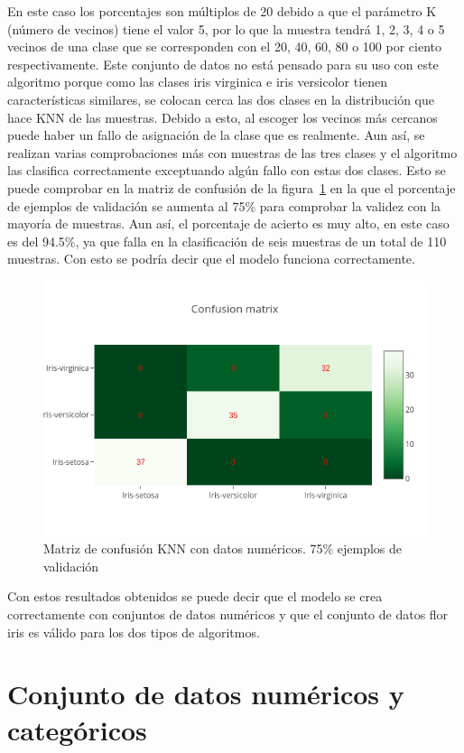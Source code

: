 \documentclass[a4paper, 12pt]{book}
\begin{document}
En este caso los porcentajes son múltiplos de 20 debido a que el parámetro K (número de vecinos) tiene el valor 5, por lo que la muestra tendrá 1, 2, 3, 4 o 5 vecinos de una clase que se corresponden con el 20, 40, 60, 80 o 100 por ciento respectivamente. 
Este conjunto de datos no está pensado para su uso con este algoritmo porque como las clases iris virginica e iris versicolor tienen características similares, se colocan cerca las dos clases en la distribución que hace KNN de las muestras. Debido a esto, al escoger los vecinos más cercanos puede haber un fallo de asignación de la clase que es realmente. 
Aun así, se realizan varias comprobaciones más con muestras de las tres clases y el algoritmo las clasifica correctamente exceptuando algún fallo con estas dos clases. Esto se puede comprobar en la matriz de confusión de la figura~\ref{fig:ejemplo16} en la que el porcentaje de ejemplos de validación se aumenta al 75\% para comprobar la validez con la mayoría de muestras. 
Aun así, el porcentaje de acierto es muy alto, en este caso es del 94.5\%, ya que falla en la clasificación de seis muestras de un total de 110 muestras. Con esto se podría decir que el modelo funciona correctamente.

\begin{figure}
	\centering
	\includegraphics[width=12cm, keepaspectratio]{img/cm_num_knn2.png}
	\caption{Matriz de confusión KNN con datos numéricos. 75\% ejemplos de validación} 	
	\label{fig:ejemplo16}
\end{figure}

Con estos resultados obtenidos se puede decir que el modelo se crea correctamente con conjuntos de datos numéricos y que el conjunto de datos flor iris es válido para los dos tipos de algoritmos.

\section{Conjunto de datos numéricos y categóricos}
\label{subsec:numericosycategoricos}
\end{document}
